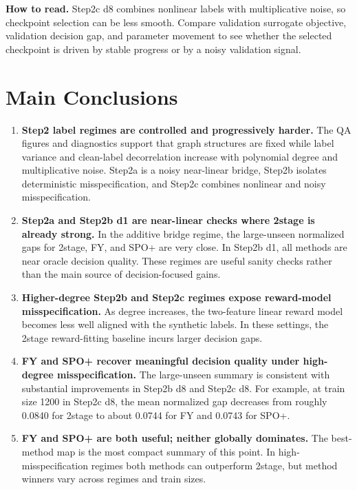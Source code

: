 \documentclass[11pt]{article}
\begin{document}
\noindent\textbf{How to read.} Step2c d8 combines nonlinear labels with multiplicative noise, so checkpoint selection can be less smooth. Compare validation surrogate objective, validation decision gap, and parameter movement to see whether the selected checkpoint is driven by stable progress or by a noisy validation signal.

\clearpage

\section{Main Conclusions}

\begin{enumerate}
  \item \textbf{Step2 label regimes are controlled and progressively harder.} The QA figures and diagnostics support that graph structures are fixed while label variance and clean-label decorrelation increase with polynomial degree and multiplicative noise. Step2a is a noisy near-linear bridge, Step2b isolates deterministic misspecification, and Step2c combines nonlinear and noisy misspecification.

  \item \textbf{Step2a and Step2b d1 are near-linear checks where 2stage is already strong.} In the additive bridge regime, the large-unseen normalized gaps for 2stage, FY, and SPO+ are very close. In Step2b d1, all methods are near oracle decision quality. These regimes are useful sanity checks rather than the main source of decision-focused gains.

  \item \textbf{Higher-degree Step2b and Step2c regimes expose reward-model misspecification.} As degree increases, the two-feature linear reward model becomes less well aligned with the synthetic labels. In these settings, the 2stage reward-fitting baseline incurs larger decision gaps.

  \item \textbf{FY and SPO+ recover meaningful decision quality under high-degree misspecification.} The large-unseen summary is consistent with substantial improvements in Step2b d8 and Step2c d8. For example, at train size 1200 in Step2c d8, the mean normalized gap decreases from roughly 0.0840 for 2stage to about 0.0744 for FY and 0.0743 for SPO+.

  \item \textbf{FY and SPO+ are both useful; neither globally dominates.} The best-method map is the most compact summary of this point. In high-misspecification regimes both methods can outperform 2stage, but method winners vary across regimes and train sizes.


\end{enumerate}
\end{document}
